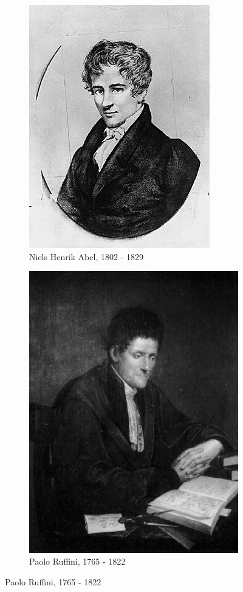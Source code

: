 \documentclass[5pt,a4paper]{article}
\begin{document}
\begin{onehalfspacing}
\begin{figure}[h]
    \centering
    \begin{subfigure}{0.4\textwidth}
    \centering
        \includegraphics[height=0.28\textheight]{ressources/abel.jpg}
        \caption{Niels Henrik Abel, 1802 - 1829}
    \end{subfigure}
    \hfill
    \begin{subfigure}{0.4\textwidth}
    \centering
        \includegraphics[height=0.28\textheight]{ressources/ruffini.jpg}
        \caption{Paolo Ruffini, 1765 - 1822}
    \end{subfigure}
\end{figure}


\end{onehalfspacing}
\end{document}
